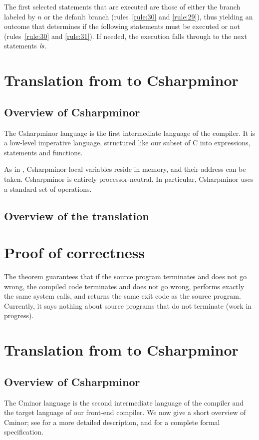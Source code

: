 \documentclass[namedreferences]{kluwer}
\begin{document}
\begin{article}
The first selected statements that are executed are those of either the branch 
labeled by $n$ or the default branch (rules~\ref{rule:30} and \ref{rule:29}), 
thus yielding an outcome that determines if the following statements must be 
executed or not (rules~\ref{rule:30} and \ref{rule:31}). If needed, the execution falls through to the next statements $\it ls$.



\section{Translation from \Clight{} to Csharpminor}
\subsection{Overview of Csharpminor}
The Csharpminor language is the first intermediate language of the compiler.
It is a low-level imperative language, structured like our subset of C into 
expressions, statements and functions.

As in \Clight{}, Csharpminor local variables reside in memory, and their address 
can be taken. Csharpminor is entirely processor-neutral. In particular, 
Csharpminor uses a standard set of operations.

\subsection{Overview of the translation}

\section{Proof of correctness}

The theorem guarantees that if the source program terminates and does
not go wrong, the compiled code terminates and does not go wrong,
performs exactly the same system calls, and returns the same exit code
as the source program.
Currently, it says nothing about source programs that do not terminate (work
in progress).

\section{Translation from \Clight{} to Csharpminor}
\subsection{Overview of Csharpminor}
The Cminor language is the second intermediate language of the compiler
and the target language of our front-end compiler.
 We now give a short overview of Cminor; see \cite{xl:popl} for a more detailed
description, and \cite{xl:compcert-backend} for a complete formal
specification.


\end{article}
\end{document}
